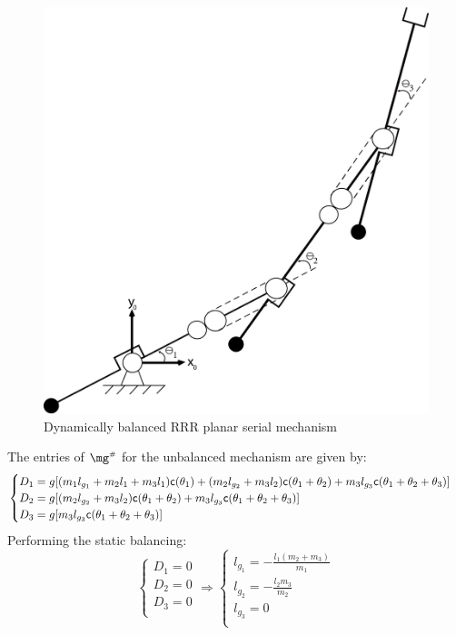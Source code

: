 \documentclass[a4paper,11pt,brazil,fleqn]{article}
\begin{document}
\begin{figure}[H]
	\centering
	\includegraphics[scale=0.11]{RRR2D.jpg}  
	\caption{Dynamically balanced RRR planar serial mechanism}
	\label{fig:RRR2D}
\end{figure}
The entries of $\mg\ssh$ for the unbalanced mechanism are given by:
\begin{equation}\label{eq:gh1}
\begin{cases}
D_1 = g[ (m_1 l_{g_1} + m_2 l_1 + m_3 l_1 ) \mathsf{c}(\theta_1) + (m_2 l_{g_2} + m_3 l_2) \mathsf{c}(\theta_1 + \theta_2) + m_3 l_{g_3} \mathsf{c}(\theta_1 + \theta_2 + \theta_3) ] \\
D_2 = g[  (m_2 l_{g_2} + m_3 l_2) \mathsf{c}(\theta_1 + \theta_2) + m_3 l_{g_3} \mathsf{c}(\theta_1 + \theta_2 + \theta_3) ] \\
D_3 = g[   m_3 l_{g_3} \mathsf{c}(\theta_1 + \theta_2 + \theta_3) ] \\
\end{cases}
\end{equation}
Performing the static balancing:
\begin{equation}\label{eq:StaticBalancing1}
\begin{cases}
D_1 = 0 \\
D_2 = 0 \\
D_3 = 0 \\
\end{cases}
\Rightarrow
\begin{cases}
l_{g_1} = -\frac{l_1(m_2 + m_3)}{m_1} \\
l_{g_2} = -\frac{l_2 m_3}{m_2} \\
l_{g_3} = 0 \\
\end{cases}
\end{equation}
\end{document}
